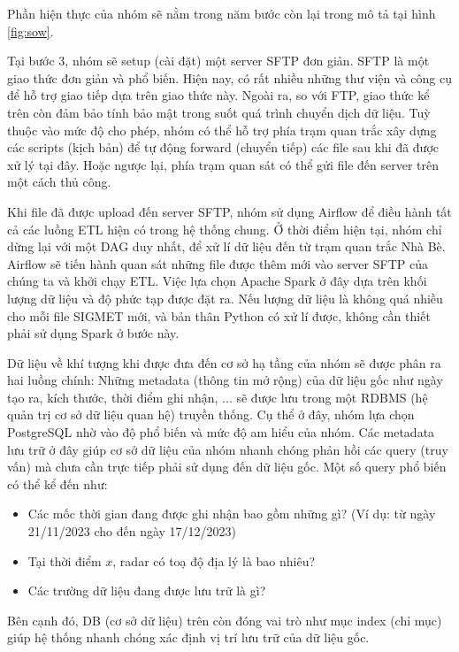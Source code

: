 Phần hiện thực của nhóm sẽ nằm trong năm bước còn lại trong mô tả tại hình \ref{fig:sow}.

Tại bước 3, nhóm sẽ setup (cài đặt) một server SFTP đơn giản. SFTP là một giao thức đơn giản và phổ biến. Hiện nay, có rất nhiều những thư viện và công cụ để hỗ trợ giao tiếp dựa trên giao thức này. Ngoài ra, so với FTP, giao thức kể trên còn đảm bảo tính bảo mật trong suốt quá trình chuyển dịch dữ liệu. Tuỳ thuộc vào mức độ cho phép, nhóm có thể hỗ trợ phía trạm quan trắc xây dựng các scripts (kịch bản) để tự động forward (chuyển tiếp) các file sau khi đã được xử lý tại đây. Hoặc ngược lại, phía trạm quan sát có thể gửi file đến server trên một cách thủ công.

Khi file đã được upload đến server SFTP, nhóm sử dụng Airflow để điều hành tất cả các luồng ETL hiện có trong hệ thống chung. Ở thời điểm hiện tại, nhóm chỉ dừng lại với một DAG duy nhất, để xử lí dữ liệu đến từ trạm quan trắc Nhà Bè. Airflow sẽ tiến hành quan sát những file được thêm mới vào server SFTP của chúng ta và khởi chạy ETL. Việc lựa chọn Apache Spark ở đây dựa trên khối lượng dữ liệu và độ phức tạp được đặt ra. Nếu lượng dữ liệu là không quá nhiều cho mỗi file SIGMET mới, và bản thân Python có xử lí được, không cần thiết phải sử dụng Spark ở bước này.

Dữ liệu về khí tượng khi được đưa đến cơ sở hạ tầng của nhóm sẽ được phân ra hai luồng chính: Những metadata (thông tin mở rộng) của dữ liệu gốc như ngày tạo ra, kích thước, thời điểm ghi nhận, ... sẽ được lưu trong một RDBMS (hệ quản trị cơ sở dữ liệu quan hệ) truyền thống. Cụ thể ở đây, nhóm lựa chọn PostgreSQL nhờ vào độ phổ biến và mức độ am hiểu của nhóm. Các metadata lưu trữ ở đây giúp cơ sở dữ liệu của nhóm nhanh chóng phản hồi các query (truy vấn) mà chưa cần trực tiếp phải sử dụng đến dữ liệu gốc. Một số query phổ biến có thể kể đến như:

\begin{itemize}
    \item Các mốc thời gian đang được ghi nhận bao gồm những gì? (Ví dụ: từ ngày 21/11/2023 cho đến ngày 17/12/2023)
    \item Tại thời điểm $x$, radar có toạ độ địa lý là bao nhiêu?
    \item Các trường dữ liệu đang được lưu trữ là gì?
\end{itemize}

Bên cạnh đó, DB (cơ sở dữ liệu) trên còn đóng vai trò như mục index (chỉ mục) giúp hệ thống nhanh chóng xác định vị trí lưu trữ của dữ liệu gốc.

